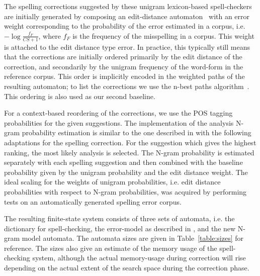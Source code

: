 \documentclass{llncs}
\begin{document}
The spelling corrections suggested by these unigram lexicon-based spell-checkers
are initially generated by composing an edit-distance automaton~\cite{agata/2002} 
with an  error weight corresponding to the probability of the error
estimated in a corpus, i.e. $-\log\frac{f_{F}}{CS+1}$, where $f_F$ is the frequency
of the misspelling in a corpus. This weight is attached to the edit distance type
error. In practice, this typically still means that the corrections are
initially ordered primarily by the edit distance of the correction, and
secondarily by the unigram frequency of the word-form in the reference corpus.
This order is implicitly encoded in the weighted paths of the resulting
automaton; to list the corrections we use the n-best paths
algorithm~\cite{mohri/2002}. This ordering is also used as our second baseline.

For a context-based reordering of the corrections, we use the POS tagging
probabilities for the given suggestions. The implementation of the analysis N-gram
probability estimation is similar to the one described in \cite{silfverberg/2011} with
the following adaptations for the spelling correction. For the suggestion which gives
the highest ranking, the most likely analysis is selected.  The N-gram probability
is estimated separately with each spelling suggestion and then combined with
the baseline probability given by the unigram probability and the edit distance
weight. The ideal scaling for the weights of unigram probabilities, i.e.
edit distance probabilities with respect to N-gram probabilities, was acquired
by performing tests on an automatically generated spelling error corpus.


The resulting finite-state system consists of three sets of automata, i.e. the dictionary
for spell-checking, the error-model as described in
\cite{pirinen/2010/lrec}, and the new N-gram model automata. The automata
sizes are given in Table~\ref{table:sizes} for reference. The sizes also
give an estimate of the memory usage of the spell-checking system, although the
actual memory-usage during correction will rise depending on the actual
extent of the search space during the correction phase.
\end{document}
